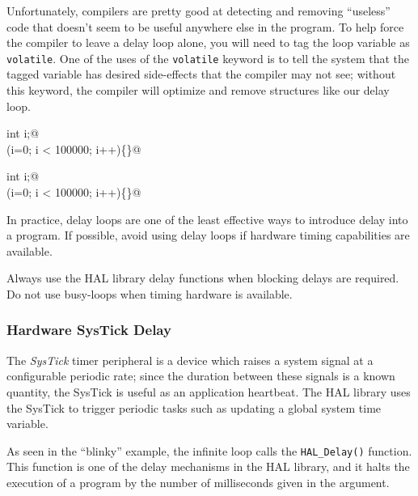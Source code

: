 \documentclass[11pt,fleqn]{book} %
\begin{document}
Unfortunately, compilers are pretty good at detecting and removing ``useless'' code that doesn't seem to be useful anywhere else in the program. To help force the compiler to leave a delay loop alone, you will need to tag the loop variable as \texttt{volatile}. One of the uses of the \texttt{volatile} keyword is to tell the system that the tagged variable has desired side-effects that the compiler may not see; without this keyword, the compiler will optimize and remove structures like our delay loop.

\colorbox{gray!20!white}{
    \centering
    \begin{minipage}{\linewidth}
        \lstinline@volatile int i;@ \\
        \lstinline@for(i=0; i < 100000; i++)\{\}@ 
    \end{minipage}
}

\smallskip
\colorbox{gray!20!white}{
    \centering
    \parbox{\linewidth-2\fboxsep}{
        \lstinline@volatile int i;@ \\
        \lstinline@for(i=0; i < 100000; i++)\{\}@ 
    }
}
\smallskip

In practice, delay loops are one of the least effective ways to introduce delay into a program. If possible, avoid using delay loops if hardware timing capabilities are available. 

\begin{warning}
    Always use the HAL library delay functions when blocking delays are required. Do not use busy-loops when timing hardware is available.
\end{warning}

\subsubsection{Hardware SysTick Delay}

The \textit{SysTick} timer peripheral is a device which raises a system signal at a configurable periodic rate; since the duration between these signals is a known quantity, the SysTick is useful as an application heartbeat. The HAL library uses the SysTick to trigger periodic tasks such as updating a global system time variable. 

As seen in the ``blinky'' example, the infinite loop calls the \texttt{HAL\_Delay()} function. This function is one of the delay mechanisms in the HAL library, and it halts the execution of a program by the number of milliseconds given in the argument. 
\end{document}
